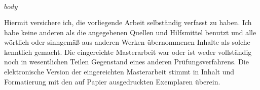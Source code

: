 \documentclass[a4paper,11pt]{article}
\begin{document}
\newpage
\pagestyle{plain}
\setcounter{page}{1}    %

$body$

\newpage
Hiermit versichere ich, die vorliegende Arbeit selbständig verfasst zu haben. Ich habe keine anderen als die angegebenen Quellen und Hilfsmittel benutzt und alle wörtlich oder sinngemäß aus   anderen   Werken   übernommenen   Inhalte   als   solche   kenntlich   gemacht.   Die   eingereichte Masterarbeit  war  oder  ist  weder  vollständig  noch  in  wesentlichen  Teilen  Gegenstand  eines  anderen Prüfungsverfahrens.  Die  elektronische  Version  der  eingereichten  Masterarbeit  stimmt  in  Inhalt  und Formatierung mit den auf Papier ausgedruckten Exemplaren überein.
\end{document}
